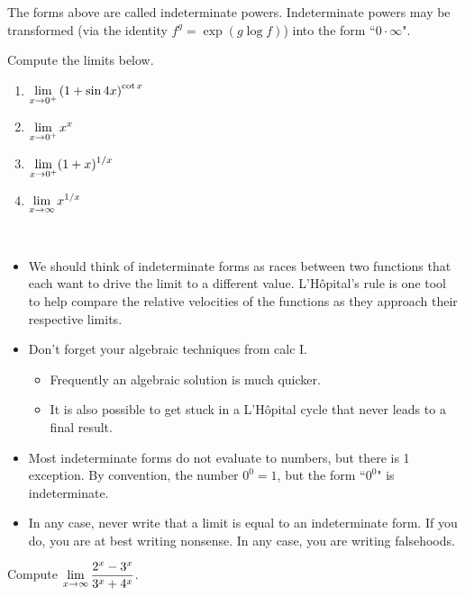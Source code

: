 \begin{remark}
The forms above are called indeterminate powers.
Indeterminate powers may be transformed (via the identity $f^g = \exp(g\log f)$) into the form ``$0\cdot \infty$".
\end{remark}

\begin{example}
Compute the limits below.
\begin{enumerate}
\item $\displaystyle\lim_{x\to 0^+}\left(1+\sin 4x\right)^{\cot x}$
\vfill
\item $\displaystyle\lim_{x\to 0^+}x^x$
\vfill
\newpage
\item $\displaystyle\lim_{x\to 0^+}(1+x)^{1/x}$
\vfill
\item $\displaystyle\lim_{x\to \infty}x^{1/x}$
\vfill
\end{enumerate}
\end{example}

\newpage

\begin{remark}\,
\begin{itemize}
\item We should think of indeterminate forms as races between two functions that each want to drive the limit to a different value.
L'H\^opital's rule is one tool to help compare the relative velocities of the functions as they approach their respective limits.
\item Don't forget your algebraic techniques from calc I.
\begin{itemize}
\item Frequently an algebraic solution is much quicker.
\item It is also possible to get stuck in a L'H\^opital cycle that never leads to a final result.
\end{itemize}
\item Most indeterminate forms do not evaluate to numbers, but there is 1 exception.  
By convention, the number $0^0 = 1$, but the form ``$0^0$" is indeterminate.  
\item In any case, never write that a limit is equal to an indeterminate form.
If you do, you are at best writing nonsense.
In any case, you are writing falsehoods.
\end{itemize}
\end{remark}

\begin{example}
Compute $\displaystyle\lim_{x\to\infty}\frac{2^x-3^x}{3^x+4^x}$.
\end{example}


